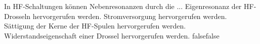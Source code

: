     {In HF-Schaltungen können Nebenresonanzen durch die ...}
    {Eigenresonanz der HF-Drosseln hervorgerufen werden.}
    {Stromversorgung hervorgerufen werden.}
    {Sättigung der Kerne der HF-Spulen hervorgerufen werden.}
    {Widerstandseigenschaft einer Drossel hervorgerufen werden.}
    {false}{false}